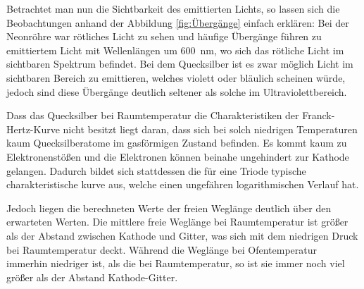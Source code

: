 	Betrachtet man nun die Sichtbarkeit des emittierten Lichts, so lassen sich die Beobachtungen anhand der Abbildung \ref{fig:Übergänge} einfach erklären:
	Bei der Neonröhre war rötliches Licht zu sehen und häufige Übergänge führen zu emittiertem Licht mit Wellenlängen um \SI{600}{\nano\meter}, wo sich das rötliche Licht im sichtbaren Spektrum befindet.
	Bei dem Quecksilber ist es zwar möglich Licht im sichtbaren Bereich zu emittieren, welches violett oder bläulich scheinen würde, jedoch sind diese Übergänge deutlich seltener als solche im Ultraviolettbereich.
	
	Dass das Quecksilber bei Raumtemperatur die Charakteristiken der Franck-Hertz-Kurve nicht besitzt liegt daran, dass sich bei solch niedrigen Temperaturen kaum Quecksilberatome im gasförmigen Zustand befinden.
	Es kommt kaum zu Elektronenstößen und die Elektronen können beinahe ungehindert zur Kathode gelangen.
	Dadurch bildet sich stattdessen die für eine Triode typische charakteristische kurve aus, welche einen ungefähren logarithmischen Verlauf hat.
	
	Jedoch liegen die berechneten Werte der freien Weglänge deutlich über den erwarteten Werten.
	Die mittlere freie Weglänge bei Raumtemperatur ist größer als der Abstand zwischen Kathode und Gitter, was sich mit dem niedrigen Druck bei Raumtemperatur deckt.
	Während die Weglänge bei Ofentemperatur immerhin niedriger ist, als die bei Raumtemperatur, so ist sie immer noch viel größer als der Abstand Kathode-Gitter.
		